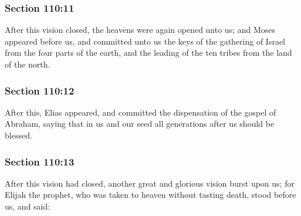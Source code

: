 	\subsubsection{Section 110:11} %
		\label{DC110-11}

		After this vision closed, the heavens were again opened unto us; and Moses appeared before us, and committed unto us the keys of the gathering of Israel from the four parts of the earth, and the leading of the ten tribes from the land of the north.


	\subsubsection{Section 110:12} %
		\label{DC110-12}

		After this, Elias appeared, and committed the dispensation of the gospel of Abraham, saying that in us and our seed all generations after us should be blessed.


	\subsubsection{Section 110:13} %
		\label{DC110-13}

		After this vision had closed, another great and glorious vision burst upon us; for Elijah the prophet, who was taken to heaven without tasting death, stood before us, and said:


